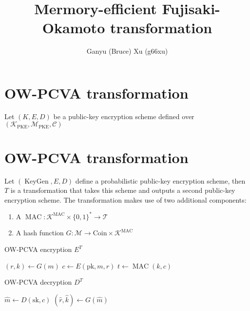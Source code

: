 \documentclass{article}
\title{Mermory-efficient Fujisaki-Okamoto transformation}
\author{Ganyu (Bruce) Xu (g66xu)}
\newcommand{\keygen}{\operatorname{KeyGen}}
\begin{document}
\maketitle

\section{OW-PCVA transformation}\label{sec:ow-pcva-transformation}
Let $(K, E, D)$ be a public-key encryption scheme defined over $(\mathcal{K}_\text{PKE}, \mathcal{M}_\text{PKE}, \mathcal{C})$

\section{OW-PCVA transformation}
Let $(\keygen, E, D)$ define a probabilistic public-key encryption scheme, then $T$ is a transformation that takes this scheme and outputs a second public-key encryption scheme. The transformation makes use of two additional components:

\begin{enumerate}
    \item A $\operatorname{MAC}: \mathcal{K}^\text{MAC} \times \{0,1\}^\ast \rightarrow \mathcal{T}$
    \item A hash function $G: \mathcal{M} \rightarrow \text{Coin} \times \mathcal{K}^\text{MAC}$
\end{enumerate}

\begin{multicols}{2}
    \begin{algorithm}[H]
        \SetAlgoLined
        \caption{OW-PCVA encryption $E^T$}
        $(r, k) \leftarrow G(m)$\;
        $c \leftarrow E(\text{pk}, m, r)$\;
        $t \leftarrow \operatorname{MAC}(k, c)$
        \;
        \;
    \end{algorithm}

    \columnbreak

    \begin{algorithm}[H]
        \SetAlgoLined
        \caption{OW-PCVA decryption $D^T$}
        $\hat{m} \leftarrow D(\text{sk}, c)$\;
        $(\hat{r}, \hat{k}) \leftarrow G(\hat{m})$\;
        \;
    \end{algorithm}
\end{multicols}
\end{document}
